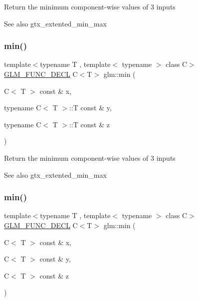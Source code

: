 Return the minimum component-\/wise values of 3 inputs \begin{DoxySeeAlso}{See also}
gtx\+\_\+extented\+\_\+min\+\_\+max 
\end{DoxySeeAlso}
\mbox{\label{group__gtx__extended__min__max_ga74d1a96e7cdbac40f6d35142d3bcbbd4}} 
\subsubsection{\texorpdfstring{min()}{min()}\hspace{0.1cm}{\footnotesize\ttfamily [2/6]}}
{\footnotesize\ttfamily template$<$typename T , template$<$ typename $>$ class C$>$ \\
\mbox{\hyperlink{setup_8hpp_ab2d052de21a70539923e9bcbf6e83a51}{G\+L\+M\+\_\+\+F\+U\+N\+C\+\_\+\+D\+E\+CL}} C$<$T$>$ glm\+::min (\begin{DoxyParamCaption}\item[{C$<$ T $>$ const \&}]{x,  }\item[{typename C$<$ T $>$\+::T const \&}]{y,  }\item[{typename C$<$ T $>$\+::T const \&}]{z }\end{DoxyParamCaption})}

Return the minimum component-\/wise values of 3 inputs \begin{DoxySeeAlso}{See also}
gtx\+\_\+extented\+\_\+min\+\_\+max 
\end{DoxySeeAlso}
\mbox{\label{group__gtx__extended__min__max_ga42b5c3fc027fd3d9a50d2ccc9126d9f0}} 
\subsubsection{\texorpdfstring{min()}{min()}\hspace{0.1cm}{\footnotesize\ttfamily [3/6]}}
{\footnotesize\ttfamily template$<$typename T , template$<$ typename $>$ class C$>$ \\
\mbox{\hyperlink{setup_8hpp_ab2d052de21a70539923e9bcbf6e83a51}{G\+L\+M\+\_\+\+F\+U\+N\+C\+\_\+\+D\+E\+CL}} C$<$T$>$ glm\+::min (\begin{DoxyParamCaption}\item[{C$<$ T $>$ const \&}]{x,  }\item[{C$<$ T $>$ const \&}]{y,  }\item[{C$<$ T $>$ const \&}]{z }\end{DoxyParamCaption})}

